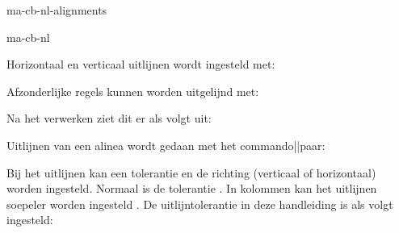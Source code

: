 \startonderdeel ma-cb-nl-alignments

\produkt ma-cb-nl




Horizontaal en verticaal uitlijnen wordt ingesteld met:


Afzonderlijke regels kunnen worden uitgelijnd met:

\starttypen
\regelrechts{}
\regellinks{}
\regelmidden{}
\stoptypen

\startbuffer
{}
\stopbuffer

\typebuffer

Na het verwerken ziet dit er als volgt uit:

\haalbuffer

Uitlijnen van een alinea wordt gedaan met het
commando||paar:


Bij het uitlijnen kan een tolerantie en de richting
(verticaal of horizontaal) worden ingesteld.
Normaal is de tolerantie . In kolommen
kan het uitlijnen soepeler worden ingesteld
. De uitlijntolerantie in deze handleiding
is als volgt ingesteld:

\starttypen
{}
\stoptypen

\stoponderdeel
